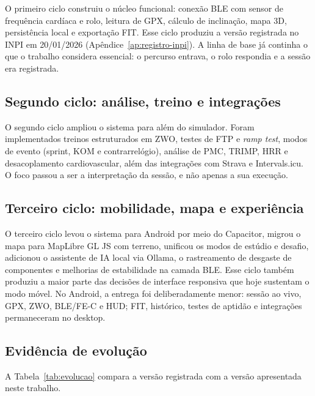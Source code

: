 O primeiro ciclo construiu o núcleo funcional: conexão BLE com sensor de
frequência cardíaca e rolo, leitura de GPX, cálculo de inclinação, mapa 3D,
persistência local e exportação FIT. Esse ciclo produziu a versão registrada no
INPI em 20/01/2026
(Apêndice~\ref{ap:registro-inpi}). A linha de base já continha o que o trabalho
considera essencial: o percurso entrava, o rolo respondia e a sessão era
registrada.

\subsection{Segundo ciclo: análise, treino e integrações}
\label{sec:segundo-ciclo}

O segundo ciclo ampliou o sistema para além do simulador. Foram implementados
treinos estruturados em ZWO, testes de FTP e \textit{ramp test}, modos de
evento (sprint, KOM e contrarrelógio), análise de PMC, TRIMP, HRR e
desacoplamento cardiovascular, além das integrações com Strava e Intervals.icu.
O foco passou a ser a interpretação da sessão, e não apenas a sua execução.

\subsection{Terceiro ciclo: mobilidade, mapa e experiência}
\label{sec:terceiro-ciclo}

O terceiro ciclo levou o sistema para Android por meio do Capacitor, migrou o
mapa para MapLibre GL JS com terreno, unificou os modos de estúdio e desafio,
adicionou o assistente de IA local via Ollama, o rastreamento de desgaste de
componentes e melhorias de estabilidade na camada BLE. Esse ciclo também
produziu a maior parte das decisões de interface responsiva que hoje sustentam
o modo móvel. No Android, a entrega foi deliberadamente menor: sessão ao vivo,
GPX, ZWO, BLE/FE-C e HUD; FIT, histórico, testes de aptidão e integrações
permaneceram no desktop.

\subsection{Evidência de evolução}
\label{sec:evolucao}

A Tabela~\ref{tab:evolucao} compara a versão registrada com a versão
apresentada neste trabalho.

